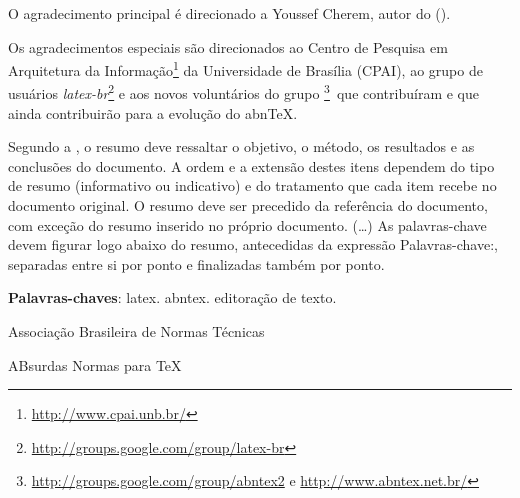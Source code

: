 \documentclass[
  12pt,       %
  openright,      %
  twoside,      %
  a4paper,      %
  english,      %
  french,       %
  spanish,      %
  brazil,       %
  ]{abntex2}
\begin{document}
\begin{agradecimentos}
O agradecimento principal é direcionado a Youssef Cherem, autor do
 ().

Os agradecimentos especiais são direcionados ao Centro de Pesquisa em
Arquitetura da Informação\footnote{\url{http://www.cpai.unb.br/}} da Universidade de
Brasília (CPAI), ao grupo de usuários
\emph{latex-br}\footnote{\url{http://groups.google.com/group/latex-br}} e aos
novos voluntários do grupo
\emph{\abnTeX}\footnote{\url{http://groups.google.com/group/abntex2} e
\url{http://www.abntex.net.br/}}~que contribuíram e que ainda
contribuirão para a evolução do abn\TeX.

\end{agradecimentos}


\setlength{\absparsep}{18pt} %
\begin{resumo}
 Segundo a , o resumo deve ressaltar o
 objetivo, o método, os resultados e as conclusões do documento. A ordem e a extensão
 destes itens dependem do tipo de resumo (informativo ou indicativo) e do
 tratamento que cada item recebe no documento original. O resumo deve ser
 precedido da referência do documento, com exceção do resumo inserido no
 próprio documento. (\ldots) As palavras-chave devem figurar logo abaixo do
 resumo, antecedidas da expressão Palavras-chave:, separadas entre si por
 ponto e finalizadas também por ponto.

 \noindent
 \textbf{Palavras-chaves}: latex. abntex. editoração de texto.
\end{resumo}

\listoffigures*
\cleardoublepage

\listoftables*
\cleardoublepage

\begin{siglas}
  \item[ABNT] Associação Brasileira de Normas Técnicas
  \item[abnTeX] ABsurdas Normas para TeX
\end{siglas}
\end{document}
